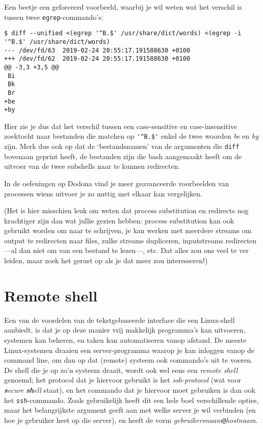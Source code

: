 \documentclass[a4paper,twoside,openany]{memoir}
\begin{document}
Een beetje een geforceerd voorbeeld, waarbij je wil weten wat het verschil is
tussen twee \verb!egrep!-commando's:

\begin{verbatim}
$ diff --unified <(egrep '^B.$' /usr/share/dict/words) <(egrep -i '^B.$' /usr/share/dict/words)
--- /dev/fd/63  2019-02-24 20:55:17.191588630 +0100
+++ /dev/fd/62  2019-02-24 20:55:17.191588630 +0100
@@ -3,3 +3,5 @@
 Bi
 Bk
 Br
+be
+by
\end{verbatim}

Hier zie je dus dat het verschil tussen een case-sensitive en case-insensitive
zoektocht naar bestanden die matchen op \verb!'^B.$'! enkel de twee woorden
\emph{be} en \emph{by} zijn. Merk dus ook op dat de `bestandsnamen' van de
argumenten die \verb!diff! bovenaan geprint heeft, de bestanden zijn die bash
aangemaakt heeft om de uitvoer van de twee subshells naar te kunnen redirecten.

In de oefeningen op Dodona vind je meer geavanceerde voorbeelden van processen
wiens uitvoer je zo nuttig met elkaar kan vergelijken.

(Het is hier misschien leuk om weten dat process substitution en redirects nog
krachtiger zijn dan wat jullie gezien hebben: process substitution kan ook
gebruikt worden om naar te schrijven, je kan werken met meerdere streams om
output te redirecten naar files, zulke streams dupliceren, inputstreams
redirecten---al dan niet om van een bestand te lezen---, etc. Dat alles zou ons
veel te ver leiden, maar zoek het gerust op als je dat meer zou interesseren!)

\chapter{Remote shell}

Een van de voordelen van de tekstgebaseerde interface die een Linux-shell
aanbiedt, is dat je op deze manier vrij makkelijk programma's kan uitvoeren,
systemen kan beheren, en taken kan automatiseren vanop afstand. De meeste
Linux-systemen draaien een server-programma waarop je kan inloggen vanop de
command line, om dan op dat (remote) systeem ook commando's uit te voeren. De
shell die je op zo'n systeem draait, wordt ook wel eens een \emph{remote shell}
genoemd; het protocol dat je hiervoor gebruikt is het \emph{ssh-protocol} (wat
voor \emph{\textbf{s}ecure \textbf{sh}ell} staat), en het commando dat je
hiervoor moet gebruiken is dan ook het \verb!ssh!-commando. Zoals gebruikelijk
heeft dit een hele boel verschillende opties, maar het belangrijkste argument
geeft aan met welke server je wil verbinden (en hoe je gebruiker heet op
die server), en heeft de vorm \emph{gebruikersnaam}\verb!@!\emph{hostnaam}.
\end{document}
